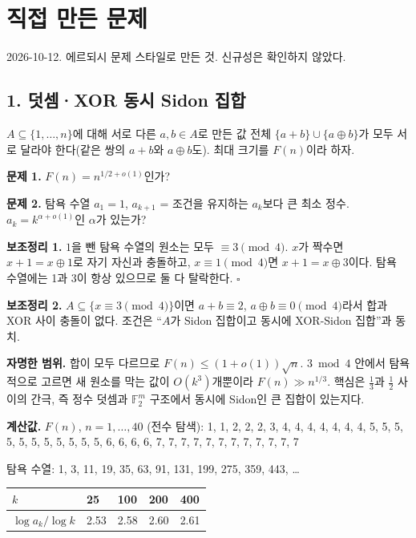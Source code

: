 \section{직접 만든 문제}

2026-10-12. 에르되시 문제 스타일로 만든 것. 신규성은 확인하지 않았다.

\subsection{1. 덧셈·XOR 동시 Sidon 집합}

\(A\subseteq\{1,\dots,n\}\)에 대해 서로 다른 \(a,b\in A\)로 만든 값 전체
\(\{a+b\}\cup\{a\oplus b\}\)가 모두 서로 달라야 한다(같은 쌍의 \(a+b\)와
\(a\oplus b\)도). 최대 크기를 \(F(n)\)이라 하자.

\textbf{문제 1.} \(F(n)=n^{1/2+o(1)}\)인가?

\textbf{문제 2.} 탐욕 수열 \(a_1=1\), \(a_{k+1}\) = 조건을 유지하는
\(a_k\)보다 큰 최소 정수. \(a_k=k^{\alpha+o(1)}\)인 \(\alpha\)가 있는가?

\textbf{보조정리 1.} \(1\)을 뺀 탐욕 수열의 원소는 모두
\(\equiv3\pmod4\). \(x\)가 짝수면 \(x+1=x\oplus1\)로 자기 자신과
충돌하고, \(x\equiv1\pmod4\)면 \(x+1=x\oplus3\)이다. 탐욕 수열에는 1과
3이 항상 있으므로 둘 다 탈락한다. \(\square\)

\textbf{보조정리 2.} \(A\subseteq\{x\equiv3\pmod4\}\)이면
\(a+b\equiv2\), \(a\oplus b\equiv0\pmod4\)라서 합과 XOR 사이 충돌이
없다. 조건은 ``\(A\)가 Sidon 집합이고 동시에 XOR-Sidon 집합''과 동치.

\textbf{자명한 범위.} 합이 모두 다르므로 \(F(n)\le(1+o(1))\sqrt n\).
\(3\bmod4\) 안에서 탐욕적으로 고르면 새 원소를 막는 값이
\(O(k^3)\)개뿐이라 \(F(n)\gg n^{1/3}\). 핵심은 \(\tfrac13\)과
\(\tfrac12\) 사이의 간극, 즉 정수 덧셈과 \(\mathbb F_2^m\) 구조에서
동시에 Sidon인 큰 집합이 있는지다.

\textbf{계산값.} \(F(n)\), \(n=1,\dots,40\) (전수 탐색): 1, 1, 2, 2, 2,
3, 4, 4, 4, 4, 4, 4, 4, 5, 5, 5, 5, 5, 5, 5, 5, 5, 5, 5, 6, 6, 6, 6, 7,
7, 7, 7, 7, 7, 7, 7, 7, 7, 7, 7

탐욕 수열: 1, 3, 11, 19, 35, 63, 91, 131, 199, 275, 359, 443, \ldots{}

\begin{longtable}[]{@{}lllll@{}}
\toprule\noalign{}
\(k\) & 25 & 100 & 200 & 400 \\
\midrule\noalign{}
\endhead
\bottomrule\noalign{}
\endlastfoot
\(\log a_k/\log k\) & 2.53 & 2.58 & 2.60 & 2.61 \\
\end{longtable}

